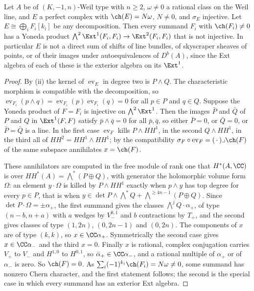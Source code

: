\begin{theorem}\label{thm:nosum}
Let $A$ be of $(K,-1,n)$-Weil type with $n\ge2$, $\omega\ne0$ a rational class
on the Weil line, and $E$ a perfect complex with $\ch(E)=N\omega$, $N\ne0$, and
$\sigma_{E}$ injective. Let
$E\cong\bigoplus_{i}F_{i}[k_{i}]$ be any decomposition. Then every summand
$F_{i}$ with $\ch(F_{i})\ne0$ has a Yoneda product
$\bigwedge^{2}\Ext^{1}(F_{i},F_{i})\to\Ext^{2}(F_{i},F_{i})$ that is not
injective. In particular $E$ is not a direct sum of shifts of line bundles,
of skyscraper sheaves of points, or of their images under autoequivalences of
$D^{b}(A)$, since the Ext algebra of each of these is the exterior algebra on
its $\Ext^{1}$.
\end{theorem}

\begin{proof}
By (ii) the kernel of $\operatorname{ev}_{E}$ in degree
two is $P\wedge Q$. The characteristic morphism is compatible with the
decomposition, so $\operatorname{ev}_{F_{i}}(p\wedge q)=
\operatorname{ev}_{F_{i}}(p)\operatorname{ev}_{F_{i}}(q)=0$ for all
$p\in P$ and $q\in Q$. Suppose the Yoneda product of $F=F_{i}$ is injective on
$\bigwedge^{2}\Ext^{1}$. Then the images $\bar P$ and $\bar Q$ of $P$ and $Q$
in $\Ext^{1}(F,F)$ satisfy $\bar p\wedge\bar q=0$ for all $\bar p,\bar q$, so
either $\bar P=0$, or $\bar Q=0$, or $\bar P=\bar Q$ is a line. In the first
case $\operatorname{ev}_{F}$ kills $P\wedge HH^{1}$, in the second
$Q\wedge HH^{1}$, in the third all of $HH^{2}=HH^{1}\wedge HH^{1}$; by the
compatibility $\sigma_{F}\circ\operatorname{ev}_{F}=(\,\cdot\,)\lrcorner
\ch(F)$ of  the same subspace annihilates $x=\ch(F)$.

These annihilators are computed in the free module of rank one that
$H^{*}(A,\CC)$ is over $HH^{*}(A)=\bigwedge^{*}(P\oplus Q)$, with generator the
holomorphic volume form $\Omega$: an element $y\cdot\Omega$ is killed by
$P\wedge HH^{1}$ exactly when $p\wedge y$ has top degree for every $p\in P$,
that is when $y\in\det P\wedge\bigwedge^{*}Q+\bigwedge^{\ge4n-1}(P\oplus Q)$.
Since $\det P\cdot\Omega=\pm\alpha_{+}$, the first summand gives the classes
$\bigwedge^{j}Q\cdot\alpha_{+}$, of type $(n-b,n+a)$ with $a$ wedges by
$V_{-}^{0,1}$ and $b$ contractions by $T_{+}$, and the second gives classes of
type $(1,2n)$, $(0,2n-1)$ and $(0,2n)$. The components of $x$ are of type
$(k,k)$, so $x\in\CC\alpha_{+}$. Symmetrically the second case gives
$x\in\CC\alpha_{-}$ and the third $x=0$. Finally $x$ is
rational, complex conjugation carries $V_{+}$ to $V_{-}$ and $H^{1,0}$ to
$H^{0,1}$, so $\bar\alpha_{+}\in\CC\alpha_{-}$, and a rational multiple of
$\alpha_{+}$ or of $\alpha_{-}$ is zero. So $\ch(F)=0$. As
$\sum_{i}(-1)^{k_{i}}\ch(F_{i})=N\omega\ne0$, some summand has nonzero
Chern character, and the first statement follows; the second is the special
case in which every summand has an exterior Ext algebra.
\end{proof}
